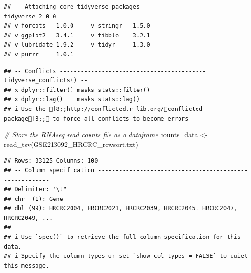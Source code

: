 \documentclass[
]{article}
\newenvironment{Shaded}{\begin{snugshade}}{\end{snugshade}}
\newcommand{\CommentTok}[1]{\textcolor[rgb]{0.56,0.35,0.01}{\textit{#1}}}
\newcommand{\FunctionTok}[1]{\textcolor[rgb]{0.00,0.00,0.00}{#1}}
\newcommand{\NormalTok}[1]{#1}
\newcommand{\OtherTok}[1]{\textcolor[rgb]{0.56,0.35,0.01}{#1}}
\newcommand{\StringTok}[1]{\textcolor[rgb]{0.31,0.60,0.02}{#1}}
\begin{document}
\begin{verbatim}
## -- Attaching core tidyverse packages ------------------------ tidyverse 2.0.0 --
## v forcats   1.0.0     v stringr   1.5.0
## v ggplot2   3.4.1     v tibble    3.2.1
## v lubridate 1.9.2     v tidyr     1.3.0
## v purrr     1.0.1
\end{verbatim}

\begin{verbatim}
## -- Conflicts ------------------------------------------ tidyverse_conflicts() --
## x dplyr::filter() masks stats::filter()
## x dplyr::lag()    masks stats::lag()
## i Use the ]8;;http://conflicted.r-lib.org/conflicted package]8;; to force all conflicts to become errors
\end{verbatim}

\begin{Shaded}
\begin{Highlighting}[]
\CommentTok{\# Store the RNAseq read counts file as a dataframe}
\NormalTok{counts\_data }\OtherTok{\textless{}{-}} \FunctionTok{read\_tsv}\NormalTok{(}\StringTok{\textquotesingle{}GSE213092\_HRCRC\_rowsort.txt\textquotesingle{}}\NormalTok{)}
\end{Highlighting}
\end{Shaded}

\begin{verbatim}
## Rows: 33125 Columns: 100
## -- Column specification --------------------------------------------------------
## Delimiter: "\t"
## chr  (1): Gene
## dbl (99): HRCRC2004, HRCRC2021, HRCRC2039, HRCRC2045, HRCRC2047, HRCRC2049, ...
## 
## i Use `spec()` to retrieve the full column specification for this data.
## i Specify the column types or set `show_col_types = FALSE` to quiet this message.
\end{verbatim}
\end{document}
